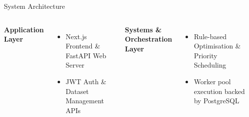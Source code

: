 \documentclass[aspectratio=169,11pt]{beamer}
\begin{document}
\begin{frame}{System Architecture}
\begin{center}
\begin{tikzpicture}
\end{tikzpicture}
\end{center}

\vspace{1mm}

\begin{columns}[T,totalwidth=\textwidth]

\textbf{\color{GEUBlue}\small Application Layer}
\begin{itemize}\itemsep1pt
\item[\tiny$\bullet$] \scriptsize Next.js Frontend \& FastAPI Web Server
\item[\tiny$\bullet$] \scriptsize JWT Auth \& Dataset Management APIs
\end{itemize}

\textbf{\color{GEUBlue}\small Systems \& Orchestration Layer}
\begin{itemize}\itemsep1pt
\item[\tiny$\bullet$] \scriptsize Rule-based Optimisation \& Priority Scheduling
\item[\tiny$\bullet$] \scriptsize Worker pool execution backed by PostgreSQL
\end{itemize}

\end{columns}

\end{frame}


\end{document}
